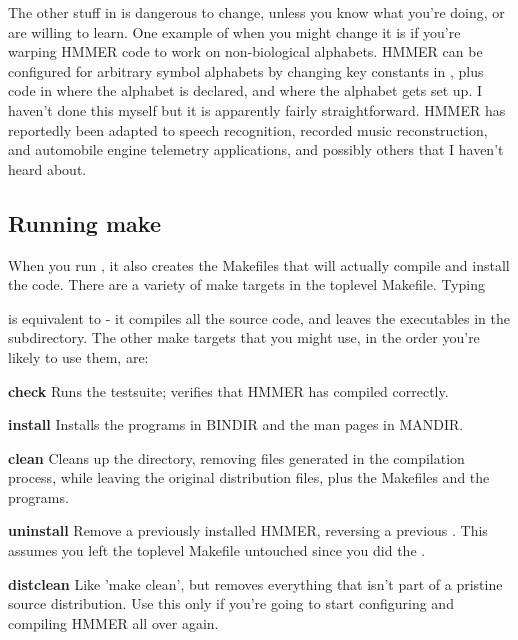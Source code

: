 The other stuff in  is dangerous to change, unless you
know what you're doing, or are willing to learn. One example of when
you might change it is if you're warping HMMER code to work on
non-biological alphabets. HMMER can be configured for arbitrary symbol
alphabets by changing key constants in , plus code in
 where the alphabet is declared, and 
where the alphabet gets set up. I haven't done this myself but it is
apparently fairly straightforward. HMMER has reportedly been adapted
to speech recognition, recorded music reconstruction, and automobile
engine telemetry applications, and possibly others that I haven't
heard about.

\subsection{Running make}

When you run , it also creates the Makefiles that will
actually compile and install the code.  There are a variety of make
targets in the toplevel Makefile. Typing


is equivalent to  - it compiles all the source code,
and leaves the executables in the  subdirectory.  The other
make targets that you might use, in the order you're likely to use
them, are:

\begin{wideitem}
\item[\textbf{check}] Runs the testsuite; verifies that HMMER has
compiled correctly.

\item[\textbf{install}] Installs the programs in BINDIR and
the man pages in MANDIR.

\item[\textbf{clean}] Cleans up the directory, removing files
generated in the compilation process, while leaving the original
distribution files, plus the Makefiles and the programs.

\item[\textbf{uninstall}] Remove a previously installed HMMER,
reversing a previous . This assumes you left the
toplevel Makefile untouched since you did the .

\item[\textbf{distclean}] Like 'make clean', but removes everything
that isn't part of a pristine source distribution. Use this only if
you're going to start configuring and compiling HMMER all over again.
\end{wideitem}

